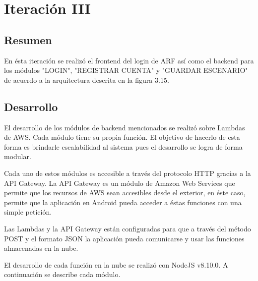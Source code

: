 \section{Iteración III}
\subsection{Resumen}
En ésta iteración se realizó el frontend del login de ARF así como el backend para los módulos "LOGIN", "REGISTRAR CUENTA" y "GUARDAR ESCENARIO" de acuerdo a la arquitectura descrita en la figura 3.15. \par

\subsection{Desarrollo}
El desarrollo de los módulos de backend mencionados se realizó sobre Lambdas de AWS. Cada módulo tiene su propia función. El objetivo de hacerlo de esta forma es brindarle escalabilidad al sistema pues el desarrollo se logra de forma modular.\par
Cada uno de estos módulos es accesible a través del protocolo HTTP gracias a la API Gateway. La API Gateway es un módulo de Amazon Web Services que permite que los recursos de AWS sean accesibles desde el exterior, en éste caso, permite que la aplicación en Android pueda acceder a éstas funciones con una simple petición.\par
Las Lambdas y la API Gateway están configuradas para que a través del método POST y el formato JSON la aplicación pueda comunicarse y usar las funciones almacenadas en la nube.\par
El desarrollo de cada función en la nube se realizó con NodeJS v8.10.0. A continuación se describe cada módulo. \par
